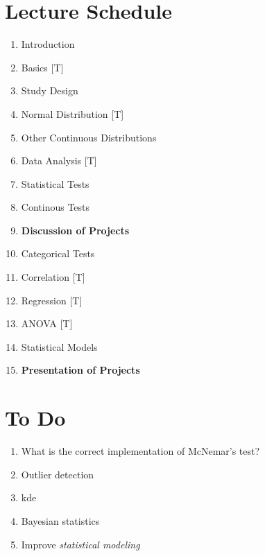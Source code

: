 \clearpage


\clearpage

\section{Lecture Schedule}

\begin{enumerate}
  \item Introduction
  \item Basics [T]
  \item Study Design
  \item Normal Distribution [T]
  \item Other Continuous Distributions
  \item Data Analysis [T]
  \item Statistical Tests
  \item Continous Tests
  \item \textbf{Discussion of Projects}
  \item Categorical Tests
  \item Correlation [T]
  \item Regression [T]
  \item ANOVA [T]
  \item Statistical Models
  \item \textbf{Presentation of Projects}
\end{enumerate}

\section{To Do}

\begin{enumerate}
  \item What is the correct implementation of McNemar's test?
  \item Outlier detection
  \item kde
  \item Bayesian statistics
  \item Improve \emph{statistical modeling}
\end{enumerate}
